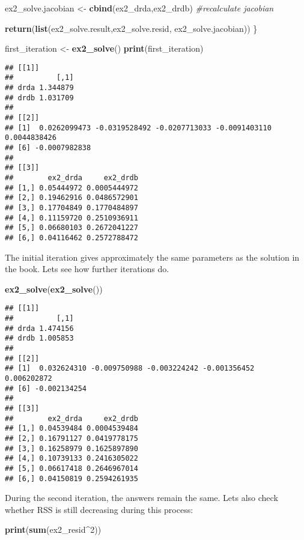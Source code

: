 \documentclass[
]{article}
\newenvironment{Shaded}{\begin{snugshade}}{\end{snugshade}}
\newcommand{\CommentTok}[1]{\textcolor[rgb]{0.56,0.35,0.01}{\textit{#1}}}
\newcommand{\DecValTok}[1]{\textcolor[rgb]{0.00,0.00,0.81}{#1}}
\newcommand{\KeywordTok}[1]{\textcolor[rgb]{0.13,0.29,0.53}{\textbf{#1}}}
\newcommand{\NormalTok}[1]{#1}
\newcommand{\OperatorTok}[1]{\textcolor[rgb]{0.81,0.36,0.00}{\textbf{#1}}}
\newcommand{\StringTok}[1]{\textcolor[rgb]{0.31,0.60,0.02}{#1}}
\begin{document}
\begin{Shaded}
\begin{Highlighting}[]
\NormalTok{  ex2\_solve.jacobian \textless{}{-}}\StringTok{ }\KeywordTok{cbind}\NormalTok{(ex2\_drda,ex2\_drdb) }\CommentTok{\#recalculate jacobian}

    \KeywordTok{return}\NormalTok{(}\KeywordTok{list}\NormalTok{(ex2\_solve.result,ex2\_solve.resid, ex2\_solve.jacobian))}
\NormalTok{  \}}

\NormalTok{first\_iteration \textless{}{-}}\StringTok{ }\KeywordTok{ex2\_solve}\NormalTok{()}
\KeywordTok{print}\NormalTok{(first\_iteration)}
\end{Highlighting}
\end{Shaded}

\begin{verbatim}
## [[1]]
##          [,1]
## drda 1.344879
## drdb 1.031709
## 
## [[2]]
## [1]  0.0262099473 -0.0319528492 -0.0207713033 -0.0091403110  0.0044838426
## [6] -0.0007982838
## 
## [[3]]
##        ex2_drda     ex2_drdb
## [1,] 0.05444972 0.0005444972
## [2,] 0.19462916 0.0486572901
## [3,] 0.17704849 0.1770484897
## [4,] 0.11159720 0.2510936911
## [5,] 0.06680103 0.2672041227
## [6,] 0.04116462 0.2572788472
\end{verbatim}

The initial iteration gives approximately the same parameters as the
solution in the book. Lets see how further iterations do.

\begin{Shaded}
\begin{Highlighting}[]
\KeywordTok{ex2\_solve}\NormalTok{(}\KeywordTok{ex2\_solve}\NormalTok{())}
\end{Highlighting}
\end{Shaded}

\begin{verbatim}
## [[1]]
##          [,1]
## drda 1.474156
## drdb 1.005853
## 
## [[2]]
## [1]  0.032624310 -0.009750988 -0.003224242 -0.001356452  0.006202872
## [6] -0.002134254
## 
## [[3]]
##        ex2_drda     ex2_drdb
## [1,] 0.04539484 0.0004539484
## [2,] 0.16791127 0.0419778175
## [3,] 0.16258979 0.1625897890
## [4,] 0.10739133 0.2416305022
## [5,] 0.06617418 0.2646967014
## [6,] 0.04150819 0.2594261935
\end{verbatim}

During the second iteration, the answers remain the same. Lets also
check whether RSS is still decreasing during this process:

\begin{Shaded}
\begin{Highlighting}[]
\KeywordTok{print}\NormalTok{(}\KeywordTok{sum}\NormalTok{(ex2\_resid}\OperatorTok{\^{}}\DecValTok{2}\NormalTok{))}
\end{Highlighting}
\end{Shaded}
\end{document}
